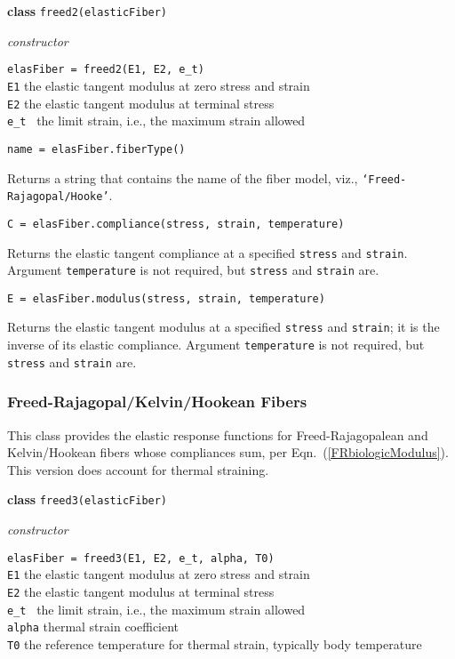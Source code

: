 \bigskip\noindent
\textbf{class} \texttt{freed2(elasticFiber)}

\medskip\noindent
\textit{constructor}

\medskip\noindent
\texttt{elasFiber = freed2(E1, E2, e\_t)} \\
\indent \texttt{E1} \quad\;\;\: the elastic tangent modulus at zero stress and strain \\
\indent \texttt{E2} \quad\;\;\: the elastic tangent modulus at terminal stress \\
\indent \texttt{e\_t} \quad\;\, the limit strain, i.e., the maximum strain allowed 

\bigskip\noindent
\texttt{name = elasFiber.fiberType()}

\medskip\noindent
Returns a string that contains the name of the fiber model, viz., \texttt{`Freed-Rajagopal/Hooke'}.

\medskip\noindent
\texttt{C = elasFiber.compliance(stress, strain, temperature)}

\medskip\noindent
Returns the elastic tangent compliance at a specified \texttt{stress} and \texttt{strain}.    Argument \texttt{temperature} is not required, but \texttt{stress} and \texttt{strain} are.

\medskip\noindent
\texttt{E = elasFiber.modulus(stress, strain, temperature)}

\medskip\noindent
Returns the elastic tangent modulus at a specified \texttt{stress} and \texttt{strain}; it is the inverse of its elastic compliance.  Argument \texttt{temperature} is not required, but \texttt{stress} and \texttt{strain} are.


\subsubsection{Freed-Rajagopal\slash Kelvin\slash Hookean Fibers}

This class provides the elastic response functions for Freed-Rajagopalean and Kelvin\slash Hookean fibers whose compliances sum, per Eqn.~(\ref{FRbiologicModulus}).  This version does account for thermal straining.

\bigskip\noindent
\textbf{class} \texttt{freed3(elasticFiber)}

\medskip\noindent
\textit{constructor}

\medskip\noindent
\texttt{elasFiber = freed3(E1, E2, e\_t, alpha, T0)} \\
\indent \texttt{E1} \quad\;\;\: the elastic tangent modulus at zero stress and strain \\
\indent \texttt{E2} \quad\;\;\: the elastic tangent modulus at terminal stress \\
\indent \texttt{e\_t} \quad\;\, the limit strain, i.e., the maximum strain allowed \\
\indent \texttt{alpha} \; thermal strain coefficient \\
\indent \texttt{T0} \quad\;\;\; the reference temperature for thermal strain, typically body temperature

